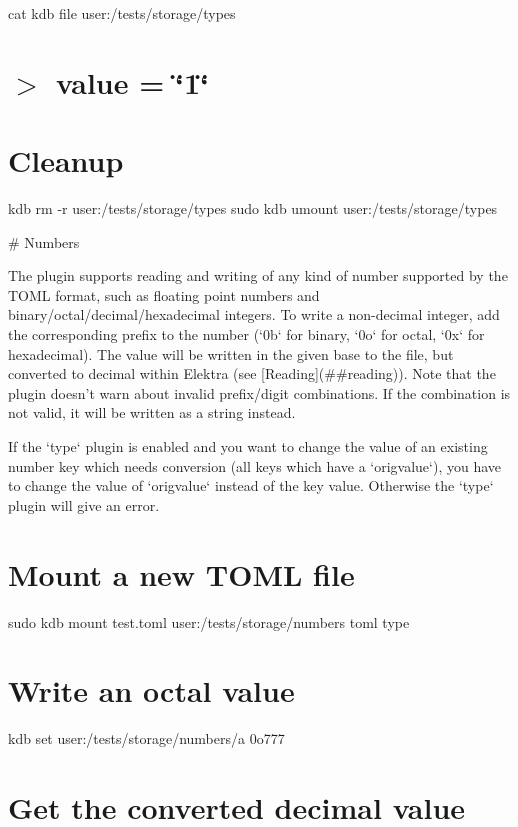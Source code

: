 cat {\ttfamily kdb file user\+:/tests/storage/types} \hypertarget{autotoc_md642_autotoc_md673}{}\section{$>$ value = \char`\"{}1\char`\"{}}\label{autotoc_md642_autotoc_md673}
\hypertarget{autotoc_md642_autotoc_md674}{}\section{Cleanup}\label{autotoc_md642_autotoc_md674}
kdb rm -\/r user\+:/tests/storage/types sudo kdb umount user\+:/tests/storage/types 
\begin{DoxyCode}
# Numbers

The plugin supports reading and writing of any kind of number supported by the TOML format, such as
       floating point numbers and binary/octal/decimal/hexadecimal integers.
To write a non-decimal integer, add the corresponding prefix to the number (`0b` for binary, `0o` for
       octal, `0x` for hexadecimal).
The value will be written in the given base to the file, but converted to decimal within Elektra (see
       [Reading](##reading)).
Note that the plugin doesn't warn about invalid prefix/digit combinations. If the combination is not valid,
       it will be written as a string instead.

If the `type` plugin is enabled and you want to change the value of an existing number key which needs
       conversion (all keys which have a `origvalue`),
you have to change the value of `origvalue` instead of the key value. Otherwise the `type` plugin will give
       an error.
\end{DoxyCode}
 \hypertarget{autotoc_md642_autotoc_md675}{}\section{Mount a new T\+O\+M\+L file}\label{autotoc_md642_autotoc_md675}
sudo kdb mount test.\+toml user\+:/tests/storage/numbers toml type\hypertarget{autotoc_md642_autotoc_md676}{}\section{Write an octal value}\label{autotoc_md642_autotoc_md676}
kdb set \textquotesingle{}user\+:/tests/storage/numbers/a\textquotesingle{} \textquotesingle{}0o777\textquotesingle{}\hypertarget{autotoc_md642_autotoc_md677}{}\section{Get the converted decimal value}\label{autotoc_md642_autotoc_md677}
